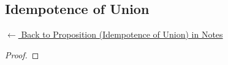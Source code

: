 
\subsection*{Idempotence of Union}
\label{prf:idempotence-union}

\begin{remark*}[Return]
\hyperref[prop:idempotence-union]{$\leftarrow$ Back to Proposition (Idempotence of Union) in Notes}
\end{remark*}

\begin{proof}
\end{proof}

\begin{remark*}

\end{remark*}

\begin{remark*}[Dependencies]

\FlashUses{}
\end{remark*}
